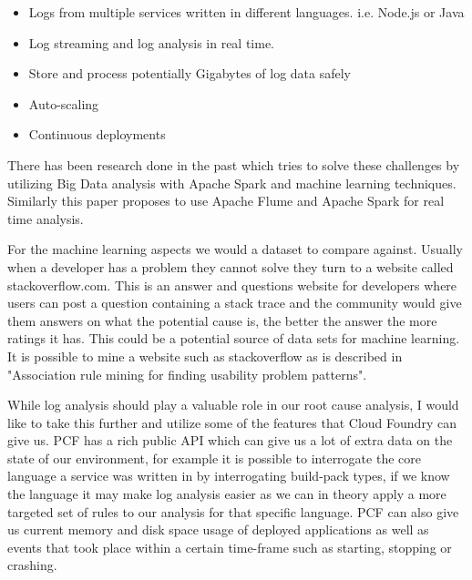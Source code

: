 \begin{itemize}
  \item Logs from multiple services written in different languages. i.e. Node.js or Java
  \item Log streaming and log analysis in real time. 
  \item Store and process potentially Gigabytes of log data safely
  \item Auto-scaling
  \item Continuous deployments
\end{itemize}

There has been research done in the past which tries to solve these challenges by utilizing Big Data analysis with Apache Spark and machine learning techniques\cite{8067504}. Similarly this paper\cite{7748933} proposes to use Apache Flume and Apache Spark for real time analysis.

For the machine learning aspects we would a dataset to compare against. Usually when a developer has a problem they cannot solve they turn to a website called stackoverflow.com. This is an answer and questions website for developers where users can post a question containing a stack trace and the community would give them answers on what the potential cause is, the better the answer the more ratings it has. This could be a potential source of data sets for machine learning. It is possible to mine a website such as stackoverflow as is described in "Association rule mining for finding usability problem patterns"\cite{8320144}.

While log analysis should play a valuable role in our root cause analysis, I would like to take this further and utilize some of the features that Cloud Foundry can give us. PCF has a rich public API which can give us a lot of extra data on the state of our environment, for example it is possible to interrogate the core language a service was written in by interrogating build-pack types, if we know the language it may make log analysis easier as we can in theory apply a more targeted set of rules to our analysis for that specific language. PCF can also give us current memory and disk space usage of deployed applications as well as events that took place within a certain time-frame such as starting, stopping or crashing.